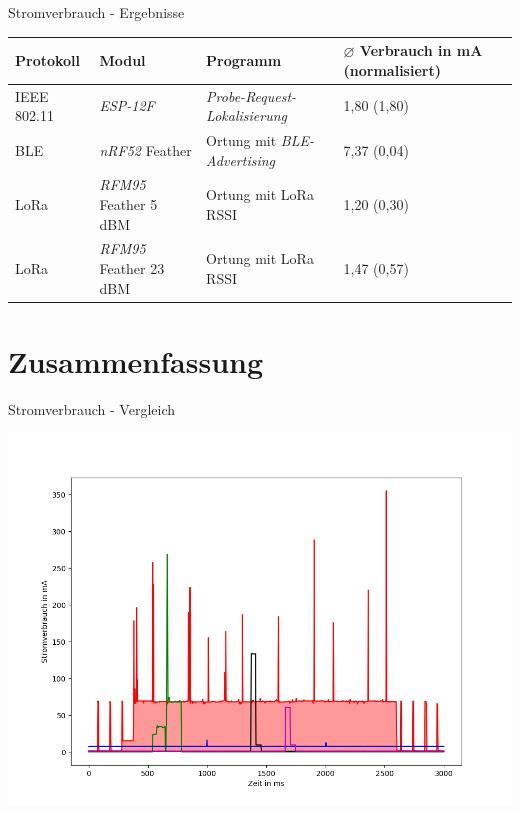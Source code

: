 \documentclass[18pt]{beamer}
\begin{document}
\begin{frame}{Stromverbrauch - Ergebnisse}
	\begin{tabular}{l|p{3cm}|p{3cm}|R{2.1cm}}
		Protokoll & Modul & Programm  & $\varnothing$ Verbrauch in mA (normalisiert)\\
		\hline
		IEEE 802.11 & \emph{ESP-12F} & \emph{Probe-Request-Lokalisierung} & 1,80 (1,80)\\
		\hline
		BLE & \emph{nRF52} Feather & Ortung mit \emph{BLE-Advertising} & 7,37 (0,04)\\
		\hline
		LoRa & \emph{RFM95} Feather 5 dBM & Ortung mit LoRa RSSI & 1,20 (0,30)\\
		LoRa & \emph{RFM95} Feather 23 dBM & Ortung mit LoRa RSSI & 1,47 (0,57)\\
	\end{tabular}
\end{frame}

\section{Zusammenfassung}
\begin{frame}{Stromverbrauch - Vergleich}
	\begin{minipage}[c][\textheight][t]{\textwidth}
		\centering
		\includegraphics[height=0.85\textheight]{plots/alle.png}
	\end{minipage}
\end{frame}
\end{document}
